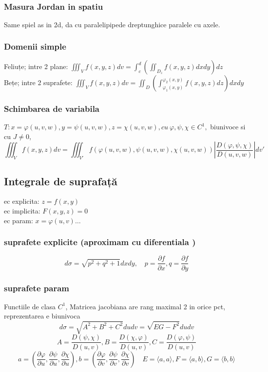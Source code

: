 \documentclass{article}
\newcommand{\parti}[2]{\frac{\partial #1}{ \partial #2}}
\begin{document}
\subsubsection*{Masura Jordan in spatiu}
Same spiel as in 2d, da cu paralelipipede dreptunghice paralele cu axele.
\subsubsection*{Domenii simple}
Feliuțe; intre 2 plane: $\displaystyle \iiint_V f(x, y, z) dv = \int_c^d \left( \iint_{D_z} f(x, y,z) dx dy \right) dz$\\
Bețe; intre 2 suprafete: $\displaystyle \iiint_V f(x, y, z) dv = \iint_D \left( \int_{\varphi_1(x,y)}^{\varphi_2(x,y)} f(x, y,z) dz \right) dx dy$\\
\subsubsection*{Schimbarea de variabila}
$T: x= \varphi(u, v, w), y= \psi(u, v, w), z= \chi(u, v, w), cu\ \varphi, \psi, \chi \in C^1,$ biunivoce si cu $J \neq 0 $,
\[ \iiint_V f(x, y, z) dv = \iiint_{V'} f(\varphi(u, v, w), \psi(u, v, w), \chi(u, v, w)) \left|\frac{D(\varphi, \psi, \chi)}{D(u,v,w)}\right| dv' \]
\subsection*{Integrale de suprafață}
ec explicita: $z= f(x, y)$\\
ec implicita: $F(x,y,z)=0$\\
ec param: $x = \varphi(u,v)\ldots$\\
\subsubsection*{suprafete explicite (aproximam cu diferentiala )}
\[d\sigma = \sqrt{p^2+q^2+1}dx dy, \quad p = \parti f x, q = \parti f y\]
\subsubsection*{suprafete param}
Functiile de clasa $C^1$, Matricea jacobiana are rang maximal 2 in orice pct, reprezentarea e biunivoca\\
\[d\sigma = \sqrt{A^2+B^2+C^2}du dv = \sqrt{EG-F^2}du dv\]
\[A = \frac{D(\psi, \chi)}{D(u, v)}, B = \frac{D(\chi, \varphi)}{D(u, v)}, C = \frac{D(\varphi, \psi)}{D(u, v)} \]
\[ a = \left( \parti{\varphi}{u}, \parti{\psi}{u}, \parti{\chi}{u} \right),
  b = \left( \parti{\varphi}{v}, \parti{\psi}{v}, \parti{\chi}{v} \right)\quad
  E = \langle a, a \rangle,
  F =\langle a, b \rangle,
  G =\langle b, b \rangle
\]
\end{document}
